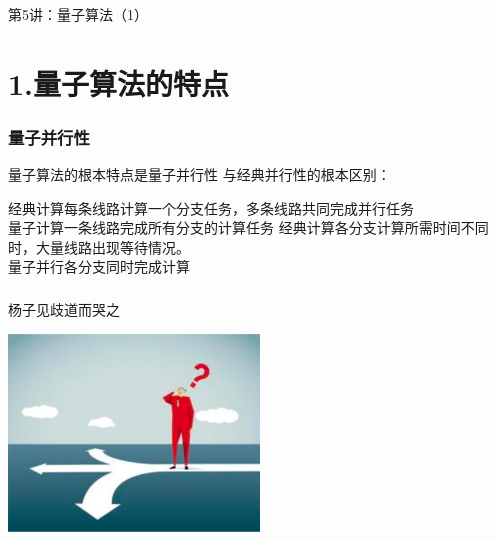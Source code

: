 

\begin{frame} [plain]
    \frametitle{}
    \Background[1] 
    \begin{center}
    {\huge 第5讲：量子算法（1）    }
    \end{center}  
    \addtocounter{framenumber}{-1}   
\end{frame}

\section{1.量子算法的特点}
\begin{frame}
    \frametitle{量子并行性}
    \begin{itemize}
        \Item 量子算法的根本特点是量子并行性
        \Item 与经典并行性的根本区别：\\
        \begin{itemize}
            \IItem 经典计算每条线路计算一个分支任务，多条线路共同完成并行任务 \\
            量子计算一条线路完成所有分支的计算任务
            \IItem 经典计算各分支计算所需时间不同时，大量线路出现等待情况。 \\
            量子并行各分支同时完成计算
        \end{itemize}
    \end{itemize}
\end{frame}

\begin{frame} 
        \frametitle{}
    杨子见歧道而哭之
    \begin{center}
        \includegraphics[width=0.5\textwidth]{figs/33.png}
    \end{center}
\end{frame}

